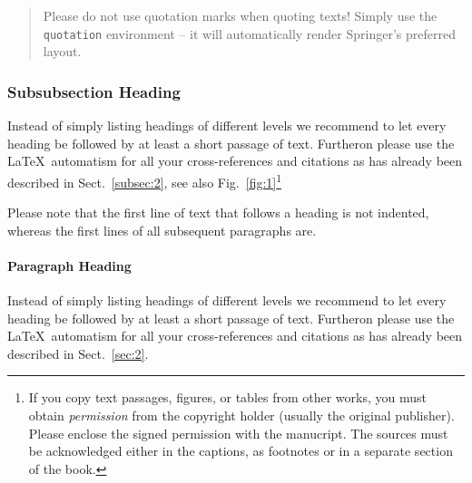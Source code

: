 \begin{quotation}
Please do not use quotation marks when quoting texts! Simply use the \verb|quotation| environment -- it will automatically render Springer's preferred layout.
\end{quotation}


\subsubsection{Subsubsection Heading}
Instead of simply listing headings of different levels we recommend to let every heading be followed by at least a short passage of text. Furtheron please use the \LaTeX\ automatism for all your cross-references and citations as has already been described in Sect.~\ref{subsec:2}, see also Fig.~\ref{fig:1}\footnote{If you copy text passages, figures, or tables from other works, you must obtain \textit{permission} from the copyright holder (usually the original publisher). Please enclose the signed permission with the manucript. The sources must be acknowledged either in the captions, as footnotes or in a separate section of the book.}

Please note that the first line of text that follows a heading is not indented, whereas the first lines of all subsequent paragraphs are.

%
%
%


\paragraph{Paragraph Heading} %
Instead of simply listing headings of different levels we recommend to let every heading be followed by at least a short passage of text. Furtheron please use the \LaTeX\ automatism for all your cross-references and citations as has already been described in Sect.~\ref{sec:2}.

